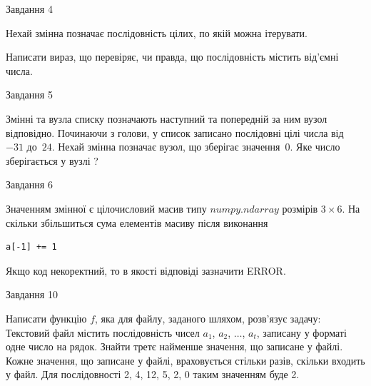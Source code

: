 \documentclass[12pt, ukrainian]{article}
\begin{document}
{\begin{minipage}[t]{8.0cm}
\end{minipage}


               
{\begin{center}Завдання {4}\end{center}}
\vspace{-4mm}
Нехай змінна  позначає послідовність цілих, по якій можна ітерувати.

Написати вираз, що перевіряє, чи правда, що послідовність  містить від’ємні числа.\par

\vspace{10mm}
               
{\begin{center}Завдання {5}\end{center}}
\vspace{-4mm}
Змінні  та  вузла списку позначають наступний та попередній за ним вузол відповідно. Починаючи з голови, у список записано послідовні цілі числа від~$-31$ до~$24$. Нехай змінна  позначає вузол, що зберігає значення~$0$.
Яке число зберігається у вузлі  ?\par

               
{\begin{center}Завдання {6}\end{center}}
\vspace{-4mm}
Значенням змінної  є цілочисловий масив типу $numpy.ndarray$ розмірів $3{\times}6$. На скільки збільшиться сума елементів масиву  після виконання
\begin{verbatim}
a[-1] += 1
\end{verbatim}


Якщо код некоректний, то в якості відповіді зазначити ERROR.\par

               
{\begin{center}Завдання {10}\end{center}}
\vspace{-4mm}

Написати функцію $f$, яка для файлу, заданого шляхом, розв’язує задачу:\\ Текстовий файл містить послідовність чисел $a_1$, $a_2$, $\ldots$, $a_t$, записану у форматі одне число на рядок. Знайти третє найменше значення, що записане у файлі. Кожне значення, що записане у файлі, враховується стільки разів, скільки входить у файл. Для послідовності 2, 4, 12, 5, 2, 0 таким значенням буде 2.

}
\end{document}
